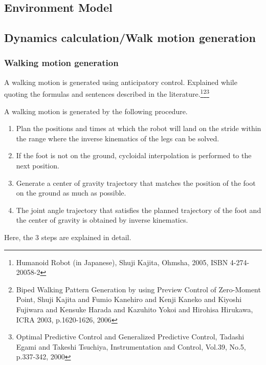  \subsection{Environment Model}
  
 \subsection{Dynamics calculation/Walk motion generation}
\subsubsection{Walking motion generation}
A walking motion is generated using anticipatory control. Explained while quoting the formulas and sentences described in the literature.\footnote{
Humanoid Robot (in Japanese), Shuji Kajita, Ohmsha, 2005, ISBN 4-274-20058-2
}\footnote{
Biped Walking Pattern Generation by using Preview Control of Zero-Moment Point, Shuji Kajita and Fumio Kanehiro and Kenji Kaneko and Kiyoshi Fujiwara and Kensuke Harada and Kazuhito Yokoi and Hirohisa Hirukawa, ICRA 2003, p.1620-1626, 2006
}\footnote{
  Optimal Predictive Control and Generalized Predictive Control, Tadashi Egami and Takeshi Tsuchiya, Instrumentation and Control, Vol.39, No.5, p.337-342, 2000
}

A walking motion is generated by the following procedure.
\begin{enumerate}
  \item Plan the positions and times at which the robot will land on the stride within the range where the inverse kinematics of the legs can be solved.
  \item If the foot is not on the ground, cycloidal interpolation is performed to the next position.
  \item Generate a center of gravity trajectory that matches the position of the foot on the ground as much as possible.
  \item The joint angle trajectory that satisfies the planned trajectory of the foot and the center of gravity is obtained by inverse kinematics.
\end{enumerate}
Here, the 3 steps are explained in detail.

